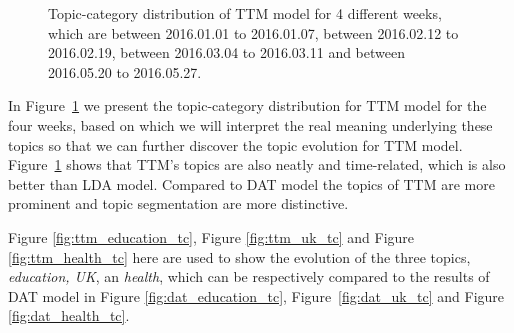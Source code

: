 \begin{figure}[!t]
\caption{\small Topic-category distribution of TTM model for 4 different weeks, which are between 2016.01.01 to 2016.01.07, between 2016.02.12 to 2016.02.19, between 2016.03.04 to 2016.03.11 and between 2016.05.20 to 2016.05.27.}
\label{fig:ttmtopiccategory}
\end{figure}

In Figure~\ref{fig:ttmtopiccategory} we present the topic-category distribution for TTM model for the four weeks, based on which we will interpret the real meaning underlying these topics so that we can further discover the topic evolution for TTM model. Figure~\ref{fig:ttmtopiccategory} shows that TTM's topics are also neatly and time-related, which is also better than LDA model. Compared to DAT model the topics of TTM are more prominent and topic segmentation are more distinctive.  

Figure \ref{fig:ttm_education_tc}, Figure \ref{fig:ttm_uk_tc} and Figure \ref{fig:ttm_health_tc} here are used to show the evolution of the three topics, \textit{education, UK}, an \textit{health}, which can be respectively compared to the results of DAT model in Figure \ref{fig:dat_education_tc}, Figure~\ref{fig:dat_uk_tc} and Figure \ref{fig:dat_health_tc}.

